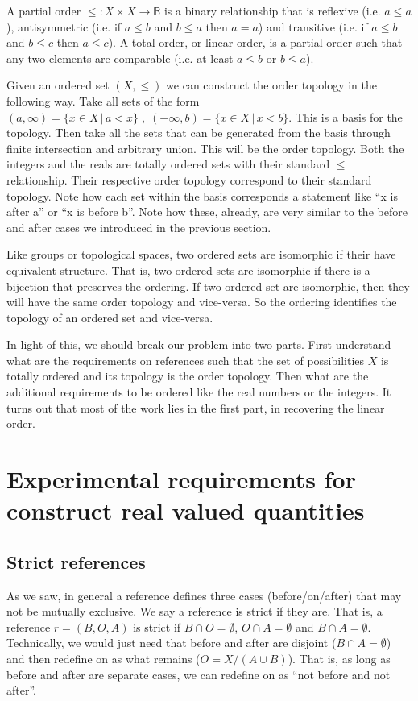 \documentclass[12pt]{iopart}
\begin{document}
A partial order $\leq : X \times X \to \mathbb{B}$ is a binary relationship that is reflexive (i.e. $a \leq a$), antisymmetric (i.e. if $a\leq b$ and $b \leq a$ then $a = a$) and transitive (i.e. if $a \leq b$ and $b \leq c$ then $a \leq c$). A total order, or linear order, is a partial order such that any two elements are comparable (i.e. at least $a \leq b$ or $b \leq a$).

Given an ordered set $(X, \leq)$ we can construct the order topology in the following way. Take all sets of the form $(a, \infty) = \{x \in X \, | \, a < x\} \;,\; (-\infty, b) = \{x \in X \, | \, x < b\}$. This is a basis for the topology. Then take all the sets that can be generated from the basis through finite intersection and arbitrary union. This will be the order topology. Both the integers and the reals are totally ordered sets with their standard $\leq$ relationship. Their respective order topology correspond to their standard topology. Note how each set within the basis corresponds a statement like ``x is after a'' or ``x is before b''. Note how these, already, are very similar to the before and after cases we introduced in the previous section.

Like groups or topological spaces, two ordered sets are isomorphic if their have equivalent structure. That is, two ordered sets are isomorphic if there is a bijection that preserves the ordering. If two ordered set are isomorphic, then they will have the same order topology and vice-versa. So the ordering identifies the topology of an ordered set and vice-versa.

In light of this, we should break our problem into two parts. First understand what are the requirements on references such that the set of possibilities $X$ is totally ordered and its topology is the order topology. Then what are the additional requirements to be ordered like the real numbers or the integers. It turns out that most of the work lies in the first part, in recovering the linear order.

\section{Experimental requirements for construct real valued quantities}

\subsection{Strict references}

As we saw, in general a reference defines three cases (before/on/after) that may not be mutually exclusive. We say a reference is strict if they are. That is, a reference $r= (B, O, A)$ is strict if $B \cap O = \emptyset$, $O \cap A = \emptyset$ and $B \cap A = \emptyset$. Technically, we would just need that before and after are disjoint ($B \cap A = \emptyset$) and then redefine on as what remains ($O = X / (A \cup B)$). That is, as long as before and after are separate cases, we can redefine on as ``not before and not after''.
\end{document}
